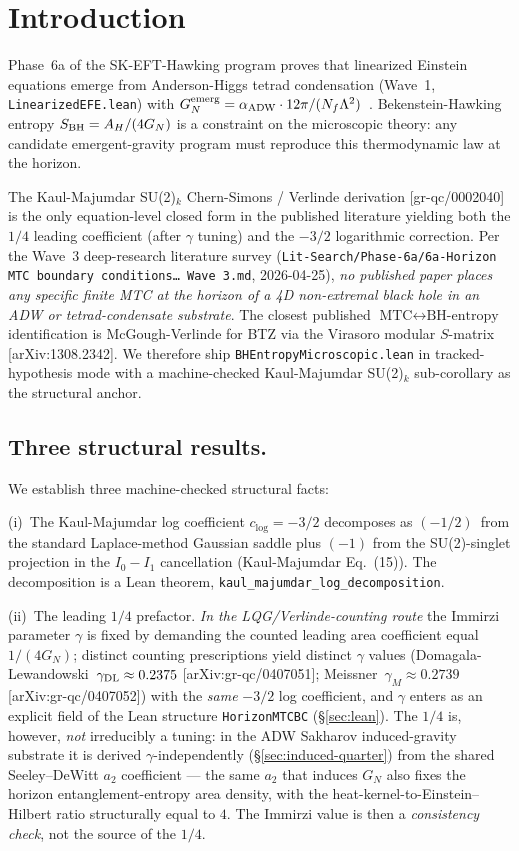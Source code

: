 \documentclass[aps,prd,twocolumn,showpacs,superscriptaddress,nofootinbib]{revtex4-2}
\newcommand{\SBH}{S_{\rm BH}}
\newcommand{\AH}{A_H}
\newcommand{\Imm}{\gamma}
\begin{document}
\section{Introduction}

Phase~6a of the SK-EFT-Hawking program proves that linearized Einstein
equations emerge from Anderson-Higgs tetrad condensation (Wave~1,
\texttt{LinearizedEFE.lean}) with $G_N^{\rm emerg} = \alpha_{\rm ADW}
\cdot 12\pi/(N_f \Lambda^2)$~\cite{Vergeles2025,Diakonov2011}.
Bekenstein-Hawking entropy $\SBH = \AH/(4 G_N)$ is a constraint on the
microscopic theory: any candidate emergent-gravity program must
reproduce this thermodynamic law at the horizon.

The Kaul-Majumdar SU(2)$_k$ Chern-Simons / Verlinde derivation
[gr-qc/0002040] is the only equation-level closed form in the
published literature yielding both the $1/4$ leading coefficient (after
$\Imm$ tuning) and the $-3/2$ logarithmic correction. Per the Wave~3
deep-research literature survey
(\texttt{Lit-Search/Phase-6a/6a-Horizon\,MTC\,boundary\,conditions\dots
Wave\,3.md}, 2026-04-25), \emph{no published paper places any specific
finite MTC at the horizon of a 4D non-extremal black hole in an ADW or
tetrad-condensate substrate}. The closest published $\text{MTC} \leftrightarrow
\text{BH-entropy}$ identification is McGough-Verlinde for BTZ via the
Virasoro modular $S$-matrix [arXiv:1308.2342]. We therefore ship
\texttt{BHEntropyMicroscopic.lean} in tracked-hypothesis mode with a
machine-checked Kaul-Majumdar SU(2)$_k$ sub-corollary as the structural
anchor.

\subsection*{Three structural results.}

We establish three machine-checked structural facts:

(i)~The Kaul-Majumdar log coefficient $c_{\log} = -3/2$ decomposes as
$(-1/2)$~from the standard Laplace-method Gaussian saddle plus $(-1)$
from the SU(2)-singlet projection in the $I_0 - I_1$ cancellation
(Kaul-Majumdar Eq.~(15)). The decomposition is a Lean theorem,
\texttt{kaul\_majumdar\_log\_decomposition}.

(ii)~The leading $1/4$ prefactor. \emph{In the LQG/Verlinde-counting route}
the Immirzi parameter $\Imm$ is fixed by demanding the counted leading area
coefficient equal $1/(4 G_N)$; distinct counting prescriptions yield distinct
$\Imm$ values (Domagala-Lewandowski~$\Imm_{\rm DL} \approx 0.2375$
[arXiv:gr-qc/0407051]; Meissner~$\Imm_M \approx 0.2739$
[arXiv:gr-qc/0407052]) with the \emph{same} $-3/2$ log coefficient, and $\Imm$
enters as an explicit field of the Lean structure \texttt{HorizonMTCBC}
(\S\ref{sec:lean}). The $1/4$ is, however, \emph{not} irreducibly a tuning: in
the ADW Sakharov induced-gravity substrate it is derived $\Imm$-independently
(\S\ref{sec:induced-quarter}) from the shared Seeley--DeWitt $a_2$ coefficient ---
the same $a_2$ that induces $G_N$ also fixes the horizon entanglement-entropy
area density, with the heat-kernel-to-Einstein--Hilbert ratio structurally equal
to $4$. The Immirzi value is then a \emph{consistency check}, not the source of
the $1/4$.
\end{document}
